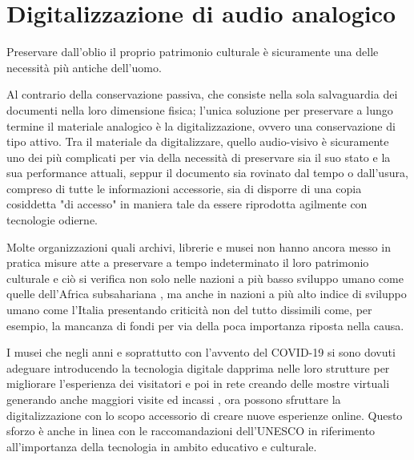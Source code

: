 
\chapter{Digitalizzazione di audio analogico} \label{chp:digitalizzazione}

Preservare dall'oblio il proprio patrimonio culturale è sicuramente una delle necessità più antiche dell'uomo.

Al contrario della conservazione passiva, che consiste nella sola salvaguardia dei documenti nella loro dimensione fisica; l'unica soluzione per preservare a lungo termine il materiale analogico è la digitalizzazione, ovvero una conservazione di tipo attivo.
Tra il materiale da digitalizzare, quello audio-visivo è sicuramente uno dei più complicati per via della necessità di preservare sia il suo stato e la sua performance attuali, seppur il documento sia rovinato dal tempo o dall'usura, compreso di tutte le informazioni accessorie, sia di disporre di una copia cosiddetta "di accesso" in maniera tale da essere riprodotta agilmente con tecnologie odierne.

Molte organizzazioni quali archivi, librerie e musei non hanno ancora messo in pratica misure atte a preservare a tempo indeterminato il loro patrimonio culturale e ciò si verifica non solo nelle nazioni a più basso sviluppo umano come quelle dell'Africa subsahariana \cite{rakemaneChallengesManagingPreserving2021}, ma anche in nazioni a più alto indice di sviluppo umano come l'Italia \cite{raimoDigitalizationCulturalIndustry2022} presentando criticità non del tutto dissimili come, per esempio, la mancanza di fondi per via della poca importanza riposta nella causa. %

I musei che negli anni e soprattutto con l'avvento del COVID-19 si sono dovuti adeguare introducendo la tecnologia digitale dapprima nelle loro strutture per migliorare l'esperienza dei visitatori e poi in rete creando delle mostre virtuali generando anche maggiori visite ed incassi \cite{raimoDigitalizationCulturalIndustry2022}, ora possono sfruttare la digitalizzazione con lo scopo accessorio di creare nuove esperienze online.
Questo sforzo è anche in linea con le raccomandazioni dell'UNESCO \cite{unescoRecommendation2015} in riferimento all'importanza della tecnologia in ambito educativo e culturale.


